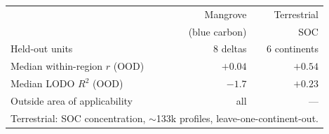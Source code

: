 \begin{tabular}{lrr}
\toprule
 & Mangrove & Terrestrial \\
 & (blue carbon) & SOC \\
\midrule
Held-out units & 8 deltas & 6 continents \\
Median within-region $r$ (OOD) & $+0.04$ & $+0.54$ \\
Median LODO $R^2$ (OOD) & $-1.7$ & $+0.23$ \\
Outside area of applicability & all & --- \\
\bottomrule
\multicolumn{3}{l}{\footnotesize Terrestrial: SOC concentration, $\sim$133k profiles, leave-one-continent-out.}\\
\end{tabular}
